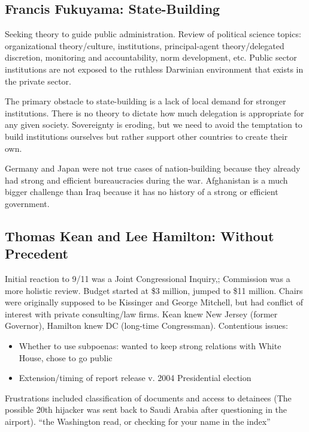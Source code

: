 \documentclass[
]{article}
\begin{document}
\hypertarget{francis-fukuyama-state-building}{%
\subsection{Francis Fukuyama:
State-Building}\label{francis-fukuyama-state-building}}

Seeking theory to guide public administration. Review of political
science topics: organizational theory/culture, institutions,
principal-agent theory/delegated discretion, monitoring and
accountability, norm development, etc. Public sector institutions are
not exposed to the ruthless Darwinian environment that exists in the
private sector.

The primary obstacle to state-building is a lack of local demand for
stronger institutions. There is no theory to dictate how much delegation
is appropriate for any given society. Sovereignty is eroding, but we
need to avoid the temptation to build institutions ourselves but rather
support other countries to create their own.

Germany and Japan were not true cases of nation-building because they
already had strong and efficient bureaucracies during the war.
Afghanistan is a much bigger challenge than Iraq because it has no
history of a strong or efficient government.

\hypertarget{thomas-kean-and-lee-hamilton-without-precedent}{%
\subsection{Thomas Kean and Lee Hamilton: Without
Precedent}\label{thomas-kean-and-lee-hamilton-without-precedent}}

Initial reaction to 9/11 was a Joint Congressional Inquiry,; Commission
was a more holistic review. Budget started at \$3 million, jumped to
\$11 million. Chairs were originally supposed to be Kissinger and George
Mitchell, but had conflict of interest with private consulting/law
firms. Kean knew New Jersey (former Governor), Hamilton knew DC
(long-time Congressman). Contentious issues:

\begin{itemize}
\item
  Whether to use subpoenas: wanted to keep strong relations with White
  House, chose to go public
\item
  Extension/timing of report release v. 2004 Presidential election
\end{itemize}

Frustrations included classification of documents and access to
detainees (The possible 20th hijacker was sent back to Saudi Arabia
after questioning in the airport). ``the Washington read, or checking
for your name in the index''
\end{document}
